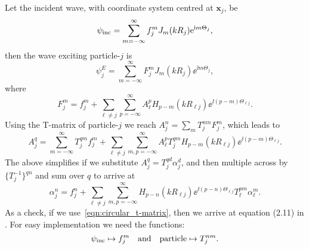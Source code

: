 \documentclass[ 12pt, a4paper]{article}
\renewcommand{\vec}[1]{\boldsymbol{#1}}
\begin{document}
Let the incident wave, with coordinate system centred at $\vec x_j$, be
\begin{equation}
  \label{eqn:incident}
  \psi_{\mathrm{inc}} = \sum_{m=-\infty}^\infty f^m_j J_{m}(k R_j) \mathrm{e}^{\mathrm{i} m \Theta_j},
\end{equation}
then the wave exciting particle-$j$ is
\begin{equation}
  \label{eqn:exciter}
  \psi_j^E = \sum_{m=-\infty}^\infty F^m_j J_m(k R_j) \ee^{\ii m \Theta_j},
\end{equation}
where
\begin{equation}
  F^m_j = f^m_j + \sum_{\ell\not = j} \sum_{p=-\infty}^\infty A_\ell^p H_{p-m}(k R_{\ell j})\ee^{\ii(p-m)\Theta_{\ell j}}.
\end{equation}
Using the T-matrix of particle-$j$ we reach $A_j^n = \sum_m T^{nm}_j F^m_j$, which leads to
\begin{equation}
A_j^q  = \sum_{m=-\infty}^\infty T^{qm}_j f^m_j + \sum_{\ell\not = j} \sum_{m,p=-\infty}^\infty A_\ell^p T^{qm}_j H_{p-m}(k R_{\ell j})\ee^{\ii(p-m)\Theta_{\ell j}}.
\label{eqn:As}
\end{equation}
The above simplifies if we substitute $A_j^q =  T^{qd}_j \alpha_j^d$, and then multiple across by $\{T^{-1}_j\}^{qn}$ and sum over $q$ to arrive at
\begin{equation}
\alpha_j^n = f^n_j + \sum_{\ell\not = j} \sum_{m,p=-\infty}^\infty  H_{p-n}(k R_{\ell j})\ee^{\ii(p - n)\Theta_{\ell j}} T^{pm}_\ell \alpha_\ell^m.
\label{eqn:As}
\end{equation}
As a check, if we use~\eqref{eqn:circular_t-matrix}, then we arrive at equation (2.11) in \cite{gower_reflection_2017}.
For easy implementation we need the functions:
\[
\psi_{\mathrm{inc}} \mapsto f^m_j \quad \text{and} \quad \text{particle} \mapsto T^{nm}_j.
\]
\end{document}
